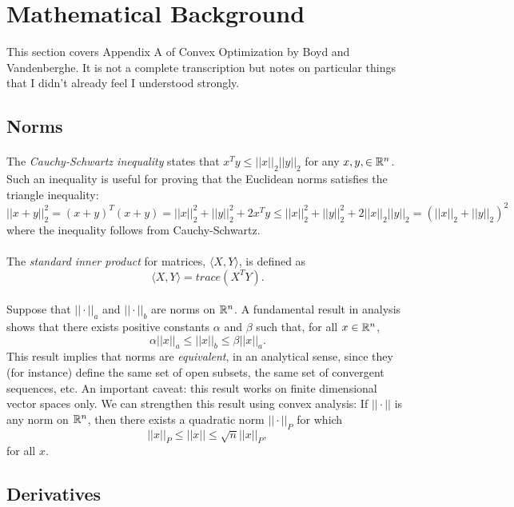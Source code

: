 \documentclass[letterpaper,12pt,oneside,onecolumn]{article}
\begin{document}
\section{Mathematical Background}
This section covers Appendix A  of Convex Optimization by Boyd and Vandenberghe. It is not a complete transcription but notes on particular things that I didn't already feel I understood strongly.
\subsection{Norms}
\paragraph{}
The {\it Cauchy-Schwartz inequality} states that $x^Ty \leq ||x||_2||y||_2$ for any $x,y,\in \mathbb{R}^n$. Such an inequality is useful for proving that the Euclidean norms satisfies the triangle inequality:
$$ ||x + y||_2^2 = (x+y)^T(x+y) = ||x||_2^2 + ||y||_2^2 + 2x^Ty \leq ||x||_2^2 + ||y||_2^2 + 2||x||_2||y||_2 = (||x||_2 + ||y||_2)^2$$
where the inequality follows from Cauchy-Schwartz.
\paragraph{}
The {\it standard inner product} for matrices, $\langle X,Y\rangle$, is defined as
$$\langle X, Y \rangle = trace(X^TY).$$
\paragraph{}
Suppose that $||\cdot ||_a$ and $||\cdot  ||_b$ are norms on $\mathbb{R}^n$. A fundamental result in analysis shows that there exists positive constants $\alpha$ and $\beta$ such that, for all $x \in \mathbb{R}^n$,
$$\alpha ||x||_a \leq ||x||_b \leq \beta ||x||_a.$$
This result implies that norms are {\it equivalent}, in an analytical sense, since they (for instance) define the same set of open subsets, the same set of convergent sequences, etc. An important caveat: this result works on finite dimensional vector spaces only. We can strengthen this result using convex analysis: If $||\cdot ||$ is any norm on $\mathbb{R}^n$, then there exists a quadratic norm $|| \cdot ||_P$ for which
$$||x||_P \leq ||x|| \leq \sqrt{n} ||x||_P,$$
for all $x$.
\subsection{Derivatives}
\end{document}
